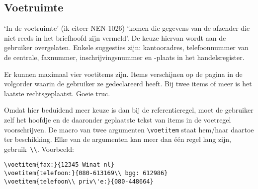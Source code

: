                                                                                 
\subsection{Voetruimte}                                                         
                                                                                
`In de voetruimte' (ik citeer NEN-1026) `komen die gegevens                     
van de afzender die niet reeds in het briefhoofd zijn                           
vermeld'. De keuze hiervan wordt aan de gebruiker overgelaten.                  
Enkele suggesties zijn: kantooradres, telefoonnummer van de                     
centrale, faxnummer, inschrijvingsnummer en -plaats in het                      
handelsregister.                                                                
                                                                                
Er kunnen maximaal vier voetitems zijn.                                         
Items verschijnen op de pagina in de volgorder waarin de                        
gebruiker ze gedeclareerd heeft.                                                
Bij twee items of meer is het laatste rechtsgeplaatst. Goeie truc.              
                                                                                
Omdat hier beduidend meer keuze is dan bij de referentieregel,                  
moet de gebruiker zelf het hoofdje en de daaronder                              
geplaatste tekst van items in de voetregel voorschrijven.                       
De macro van twee argumenten \verb.\voetitem. staat                             
hem/haar daartoe ter beschikking. Elke van de argumenten                        
kan meer dan \'e\'en regel lang zijn, gebruik~\verb.\\..                        
Voorbeeld:                                                                      
\begin{verbatim}                                                                
\voetitem{fax:}{12345 Winat nl}                                                 
\voetitem{telefoon:}{080-613169\\ bgg: 612986}                                  
\voetitem{telefoon\\ priv\'e:}{080-448664}\end{verbatim}                        
                                                                                
